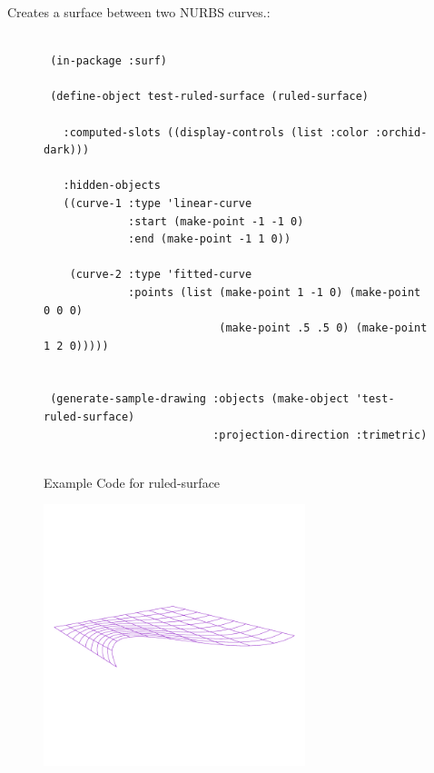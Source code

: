 \documentclass [11pt]{book}
\begin{document}
\begin{itemize}
\begin{description}
Creates a surface between two NURBS curves.:



\end{description}




\begin{figure}
\begin{lrbox}{\boxedverb}
\begin{minipage}{\linewidth}
{\small

\begin{verbatim}
                  
 (in-package :surf)

 (define-object test-ruled-surface (ruled-surface)
  
   :computed-slots ((display-controls (list :color :orchid-dark)))

   :hidden-objects
   ((curve-1 :type 'linear-curve
             :start (make-point -1 -1 0)
             :end (make-point -1 1 0))
   
    (curve-2 :type 'fitted-curve
             :points (list (make-point 1 -1 0) (make-point 0 0 0) 
                           (make-point .5 .5 0) (make-point 1 2 0)))))


 (generate-sample-drawing :objects (make-object 'test-ruled-surface)
                          :projection-direction :trimetric)


\end{verbatim}}
\end{minipage}
\end{lrbox}
\fbox{\usebox{\boxedverb}}

\caption{Example Code for ruled-surface}

\label{fig:example-code-ruled-surface}

\end{figure}

\begin{figure}
\begin{center}
\includegraphics[width=3in,height=3in]{../images/example-ruled-surface.pdf}
\end{center}


\end{figure}
\end{itemize}
\end{document}
